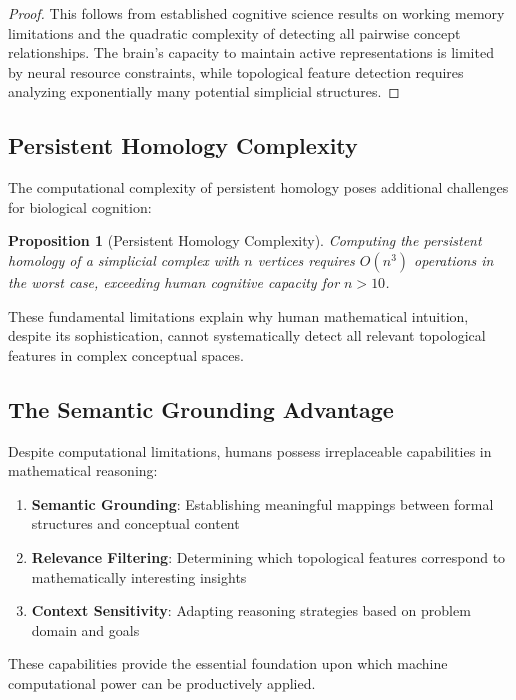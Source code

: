 \documentclass[11pt]{article}
\newtheorem{proposition}[theorem]{Proposition}
\begin{document}
\begin{proof}
This follows from established cognitive science results on working memory limitations \cite{miller1956magical} and the quadratic complexity of detecting all pairwise concept relationships. The brain's capacity to maintain active representations is limited by neural resource constraints, while topological feature detection requires analyzing exponentially many potential simplicial structures.
\end{proof}

\subsection{Persistent Homology Complexity}

The computational complexity of persistent homology poses additional challenges for biological cognition:

\begin{proposition}[Persistent Homology Complexity]
Computing the persistent homology of a simplicial complex with $n$ vertices requires $O(n^3)$ operations in the worst case, exceeding human cognitive capacity for $n > 10$.
\end{proposition}

These fundamental limitations explain why human mathematical intuition, despite its sophistication, cannot systematically detect all relevant topological features in complex conceptual spaces.

\subsection{The Semantic Grounding Advantage}

Despite computational limitations, humans possess irreplaceable capabilities in mathematical reasoning:

\begin{enumerate}
\item \textbf{Semantic Grounding}: Establishing meaningful mappings between formal structures and conceptual content
\item \textbf{Relevance Filtering}: Determining which topological features correspond to mathematically interesting insights
\item \textbf{Context Sensitivity}: Adapting reasoning strategies based on problem domain and goals
\end{enumerate}

These capabilities provide the essential foundation upon which machine computational power can be productively applied.
\end{document}
